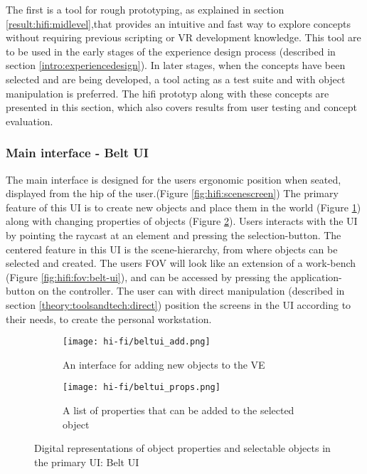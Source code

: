 The first is a tool for rough prototyping, as explained in section \ref{result:hifi:midlevel},that provides an intuitive and fast way to explore concepts without requiring previous scripting or VR development knowledge. This tool are to be used in the early stages of the experience design process (described in section \ref{intro:experiencedesign}). In later stages, when the concepts have been selected and are being developed, a tool acting as a test suite and with object manipulation is preferred. The hifi prototyp along with these concepts are presented in this section, which also covers results from user testing and concept evaluation.
\subsubsection{Main interface - Belt UI}
The main interface is designed for the users ergonomic position when seated, displayed from the hip of the user.(Figure \ref{fig:hifi:scenescreen}) The primary feature of this UI is to create new objects and place them in the world (Figure \ref{fig:hifi:belt-ui:add}) along with changing properties of objects (Figure \ref{fig:hifi:belt-ui:props}). Users interacts with the UI by pointing the raycast at an element and pressing the selection-button. The centered feature in this UI is the scene-hierarchy, from where objects can be selected and created. The users FOV will look like an extension of a work-bench (Figure \ref{fig:hifi:fov:belt-ui}), and can be accessed by pressing the application-button on the controller. The user can with direct manipulation (described in section \ref{theory:toolsandtech:direct}) position the screens in the UI according to their needs, to create the personal workstation.
%
\begin{figure}
\begin{subfigure}{.5\textwidth}
  \centering
  \texttt{[image: hi-fi/beltui\_add.png]}
  \caption{An interface for adding new objects to the VE}
  \label{fig:hifi:belt-ui:add}
\end{subfigure}%
\begin{subfigure}{.5\textwidth}
  \centering
  \texttt{[image: hi-fi/beltui\_props.png]}
  \caption{A list of properties that can be added to the selected object}
  \label{fig:hifi:belt-ui:props}
\end{subfigure}
\caption{Digital representations of object properties and selectable objects in the primary UI: Belt UI}
\label{fig:hifi:belt-ui}
\end{figure}


